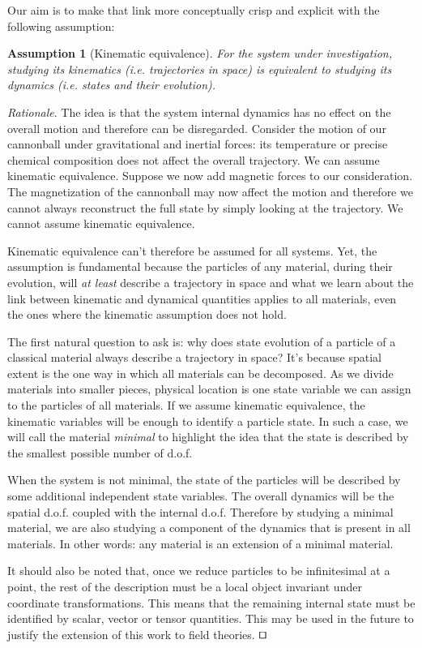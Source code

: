 \documentclass[smallextended]{svjour3}
\numberwithin{equation}{section}
\newenvironment{rationale}{\emph{Rationale}.}{\hfill\(\qed\)}
\newtheorem{assump}{Assumption}
\theoremstyle{definition}
\newenvironment{rationale}{\emph{Rationale}.}{\qed}
\begin{document}
Our aim is to make that link more conceptually crisp and explicit with the following assumption:

\begin{assump}[Kinematic equivalence]\label{ass:kinematic_equivalence}
	For the system under investigation, studying its kinematics  (i.e. trajectories in space) is equivalent to studying its dynamics  (i.e. states and their evolution).
\end{assump}

\begin{rationale}
	The idea is that the system internal dynamics has no effect on the overall motion and therefore can be disregarded. Consider the motion of our cannonball under gravitational and inertial forces: its temperature or precise chemical composition does not affect the overall trajectory. We can assume kinematic equivalence. Suppose we now add magnetic forces to our consideration. The magnetization of the cannonball may now affect the motion and therefore we cannot always reconstruct the full state by simply looking at the trajectory. We cannot assume kinematic equivalence.
	
	Kinematic equivalence can't therefore be assumed for all systems. Yet, the assumption is fundamental because the particles of any material, during their evolution, will \emph{at least} describe a trajectory in space and what we learn about the link between kinematic and dynamical quantities applies to all materials, even the ones where the kinematic assumption does not hold.
	
	The first natural question to ask is: why does state evolution of a particle of a classical material always describe a trajectory in space? It's because spatial extent is the one way in which all materials can be decomposed. As we divide materials into smaller pieces, physical location is one state variable we can assign to the particles of all materials. If we assume kinematic equivalence, the kinematic variables will be enough to identify a particle state. In such a case, we will call the material \emph{minimal} to highlight the idea that the state is described by the smallest possible number of d.o.f.
	
	When the system is not minimal, the state of the particles will be described by some additional independent state variables. The overall dynamics will be the spatial d.o.f. coupled with the internal d.o.f. Therefore by studying a minimal material, we are also studying a component of the dynamics that is present in all materials. In other words: any material is an extension of a minimal material.
	
	It should also be noted that, once we reduce particles to be infinitesimal at a point, the rest of the description must be a local object invariant under coordinate transformations. This means that the remaining internal state must be identified by scalar, vector or tensor quantities. This may be used in the future to justify the extension of this work to field theories. 
\end{rationale}
\end{document}
